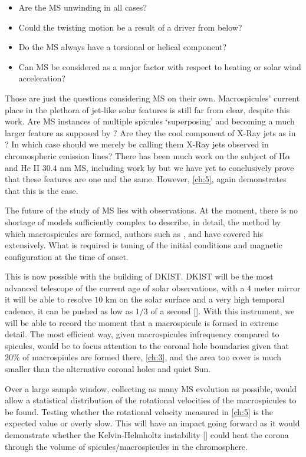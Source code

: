 \begin{itemize}
	\item{Are the MS unwinding in all cases?}
	\item{Could the twisting motion be a result of a driver from below?}
	\item{Do the MS always have a torsional or helical component?}
	\item{Can MS be considered as a major factor with respect to heating or solar wind acceleration?}
\end{itemize}
 
 
Those are just the questions considering MS on their own.
Macrospicules' current place in the plethora of jet-like solar features is still far from clear, despite this work.
Are MS instances of multiple spicules `superposing' and becoming a much larger feature as supposed by \cite{Xia2005}?
Are they the cool component of X-Ray jets as in \cite{Parenti2002}? In which case should we merely be calling them X-Ray jets observed in chromospheric emission lines?
There has been much work on the subject of H$\alpha$ and He II $30.4$ nm MS, including work by \cite{LaBonte79,Wang1998} but we have yet to conclusively prove that these features are one and the same.
However, \cref{ch:5}, again demonstrates that this is the case.
 
The future of the study of MS lies with observations.
At the moment, there is no shortage of models sufficiently complex to describe, in detail, the method by which macrospicules are formed, authors such as \cite{Murawski2011}, \cite{Archontis2005} and \cite{Moreno2008} have covered his extensively.
What is required is tuning of the initial conditions and magnetic configuration at the time of onset.

This is now possible with the building of DKIST.
DKIST will be the most advanced telescope of the current age of solar observations, with a 4 meter mirror it will be able to resolve $10$ km on the solar surface and a very high temporal cadence, it can be pushed as low as $1/3$ of a second [\cite{Woeger2016}].
With this instrument, we will be able to record the moment that a macrospicule is formed in extreme detail.
The most efficient way, given macrospicules infrequency compared to spicules, would be to focus attention to the coronal hole boundaries given that $20\%$ of macrospiules are formed there, \cref{ch:3}, and the area too cover is much smaller than the alternative coronal holes and quiet Sun.

Over a large sample window, collecting as many MS evolution as possible, would allow a statistical distribution of the rotational velocities of the macrospicules to be found.
Testing whether the rotational velocity measured in \cref{ch:5} is the expected value or overly slow.
This will have an impact going forward as it would demonstrate whether the Kelvin-Helmholtz instability [\cite{Zaqarashvili2014}] could heat the corona through the volume of spicules/macrospicules in the chromosphere. 

